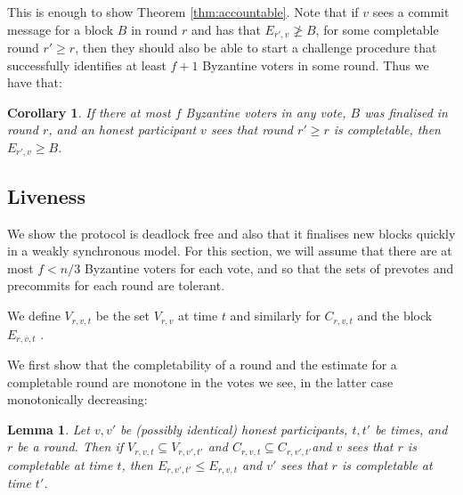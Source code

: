 \documentclass{article}
\newtheorem{lemma}[theorem]{Lemma}
\newtheorem{corollary}[theorem]{Corollary}
\begin{document}
This is enough to show Theorem \ref{thm:accountable}.  Note that if $v$ sees a commit message for a block $B$ in round $r$ and has that $E_{r',v} \not\geq B$, for some completable round $r' \geq r$, then they should also be able to start a challenge procedure that successfully identifies at least $f+1$ Byzantine voters in some round. Thus we have that:

\begin{corollary} \label{cor:overestimate-final}
If there at most $f$ Byzantine voters in any vote, $B$ was finalised in round $r$, and an honest participant $v$ sees that round $r' \geq r$ is completable, then $E_{r',v} \geq B$.
\end{corollary}

\subsection{Liveness }

We show the protocol is deadlock free and also that it finalises new blocks quickly in a weakly synchronous model.
For this section, we will assume that there are at most $f < n/3$ Byzantine voters for each vote, and so that the sets of prevotes and precommits for each round are tolerant.

We define $V_{r,v,t}$ be the set $V_{r,v}$ at time $t$ and similarly for $C_{r,v,t}$ and the block $E_{r,v,t}$ .

We first show that the completability of a round and the estimate for a completable round are monotone in the votes we see, in the latter case monotonically decreasing: 

\begin{lemma} \label{lem:message-monotonicity-completed-estimate}
Let $v,v'$ be (possibly identical) honest participants, $t,t'$ be times, and $r$ be a round.
Then if $V_{r,v,t} \subseteq V_{r,v',t'}$ and $C_{r,v,t} \subseteq C_{r,v',t'}$and $v$ sees that $r$ is completable at time $t$, then $E_{r,v',t'} \leq E_{r,v,t}$ and $v'$ sees that $r$ is completable at time $t'$.
\end{lemma}
\end{document}
